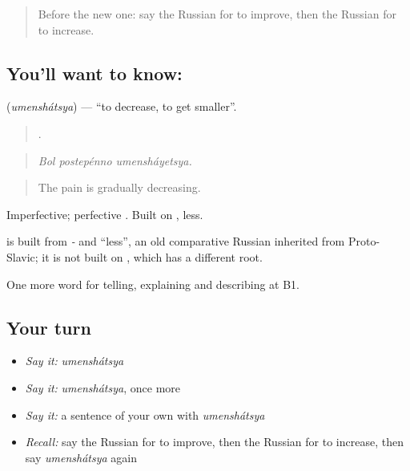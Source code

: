 \label{lesson:RU-C354-umenshatsya}



\begin{quote}
Before the new one: say the Russian for to improve, then the Russian for to increase.
\end{quote}

\subsection*{You'll want to know: }
\textbf{} (\emph{umenshátsya}) — \textquotedblleft{}to decrease, to get smaller\textquotedblright{}.

\begin{quote}
  .
\end{quote}

\begin{quote}
\emph{Bol postepénno umensháyetsya.}
\end{quote}

\begin{quote}
The pain is gradually decreasing.
\end{quote}

Imperfective; perfective \emph{}. Built on \emph{}, less.

\begin{cousinweb}
\textbf{} is built from \emph{-} and \emph{} \textquotedblleft{}less\textquotedblright{}, an old comparative Russian inherited from Proto-Slavic; it is not built on \emph{}, which has a different root.
\end{cousinweb}

\begin{grammarlens}[title={What you've built}]
One more word for telling, explaining and describing at B1.
\end{grammarlens}

\subsection*{Your turn}
\begin{itemize}
\raggedright
  \item \emph{Say it:} \emph{umenshátsya}
  \item \emph{Say it:} \emph{umenshátsya}, once more
  \item \emph{Say it:} a sentence of your own with \emph{umenshátsya}
  \item \emph{Recall:} say the Russian for to improve, then the Russian for to increase, then say \emph{umenshátsya} again
\end{itemize}

